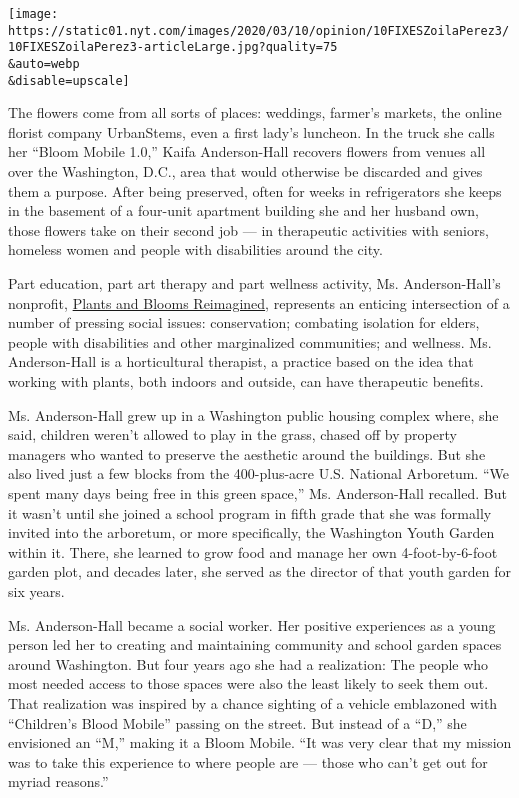 \texttt{[image: https://static01.nyt.com/images/2020/03/10/opinion/10FIXESZoilaPerez3/10FIXESZoilaPerez3-articleLarge.jpg?quality=75\\\&auto=webp\\\&disable=upscale]}

The flowers come from all sorts of places: weddings, farmer's markets,
the online florist company UrbanStems, even a first lady's luncheon. In
the truck she calls her ``Bloom Mobile 1.0,'' Kaifa Anderson-Hall
recovers flowers from venues all over the Washington, D.C., area that
would otherwise be discarded and gives them a purpose. After being
preserved, often for weeks in refrigerators she keeps in the basement of
a four-unit apartment building she and her husband own, those flowers
take on their second job --- in therapeutic activities with seniors,
homeless women and people with disabilities around the city.

Part education, part art therapy and part wellness activity, Ms.
Anderson-Hall's nonprofit,
\href{http://www.plantsandbloomsreimagined.org/p/home.html}{Plants and
Blooms Reimagined}, represents an enticing intersection of a number of
pressing social issues: conservation; combating isolation for elders,
people with disabilities and other marginalized communities; and
wellness. Ms. Anderson-Hall is a horticultural therapist, a practice
based on the idea that working with plants, both indoors and outside,
can have therapeutic benefits.

Ms. Anderson-Hall grew up in a Washington public housing complex where,
she said, children weren't allowed to play in the grass, chased off by
property managers who wanted to preserve the aesthetic around the
buildings. But she also lived just a few blocks from the 400-plus-acre
U.S. National Arboretum. ``We spent many days being free in this green
space,'' Ms. Anderson-Hall recalled. But it wasn't until she joined a
school program in fifth grade that she was formally invited into the
arboretum, or more specifically, the Washington Youth Garden within it.
There, she learned to grow food and manage her own 4-foot-by-6-foot
garden plot, and decades later, she served as the director of that youth
garden for six years.

Ms. Anderson-Hall became a social worker. Her positive experiences as a
young person led her to creating and maintaining community and school
garden spaces around Washington. But four years ago she had a
realization: The people who most needed access to those spaces were also
the least likely to seek them out. That realization was inspired by a
chance sighting of a vehicle emblazoned with ``Children's Blood Mobile''
passing on the street. But instead of a ``D,'' she envisioned an ``M,''
making it a Bloom Mobile. ``It was very clear that my mission was to
take this experience to where people are --- those who can't get out for
myriad reasons.''

